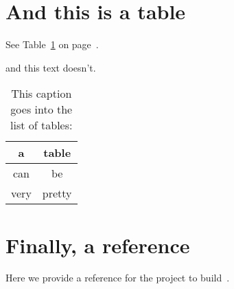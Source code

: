 \section{And this is a table}

See Table~\ref{tab:table_reference} on page~\pageref{tab:table_reference}.

\begin{table}[htb]
\figsp
\caption{This caption goes into the list of tables:}
and this text doesn't.

\begin{center}
\begin{tabular}{|c||c|}
\hline
a & table \\
\hline
can & be \\
\hline
very & pretty \\
\hline
\end{tabular}
\end{center}

\label{tab:table_reference}

\end{table}

\section{Finally, a reference}

Here we provide a reference for the project to
build~\cite{Boe:2013:HLS:2445196.2445265}.

